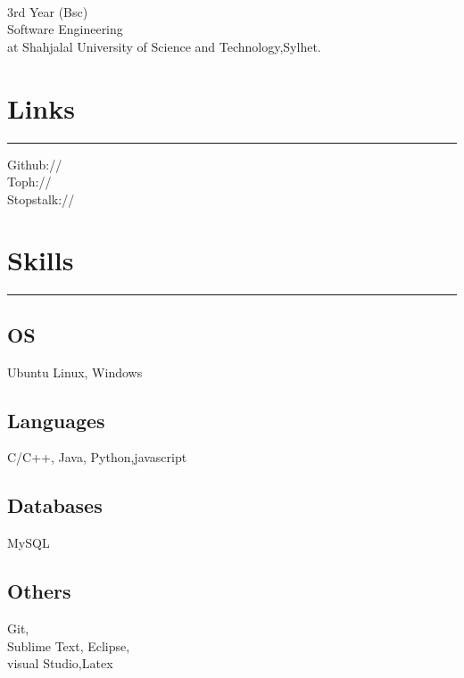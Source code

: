 \documentclass[]{rahulworld-resume}
\begin{document}
%
%

\begin{minipage}[t]{0.33\textwidth} 
\begin{large}
	\\
\end{large}
3rd Year (Bsc)\\
Software   Engineering\\ 
at Shahjalal University of Science and Technology,Sylhet.
 \\ 
 
\section{Links} 
\noindent\rule{5cm}{0.4pt}

Github:// \href{https://github.com/shreshthajit}{} \\
Toph://  \href{https://toph.co/u/SDJ_sust}{} \\
Stopstalk://  \href{https://www.stopstalk.com/user/profile/shreshthajit5}{} 
\section{Skills}
\noindent\rule{5cm}{0.4pt}
\subsection{OS}
Ubuntu Linux, Windows
\vspace{6pt}
\subsection{Languages}
C/C++, Java, Python,javascript
\vspace{6pt}
\vspace{6pt}
\subsection{Databases}
MySQL
\vspace{6pt}
\subsection{Others}
Git,\\Sublime Text, Eclipse,\\
visual Studio,Latex\\


\end{minipage}
\end{document}
